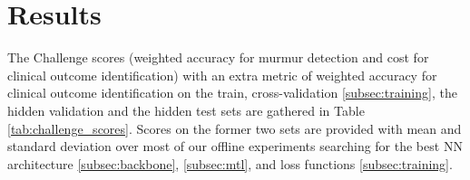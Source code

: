 \section{Results}
\label{sec:results}

The Challenge scores (weighted accuracy for murmur detection and cost for clinical outcome identification) with an extra metric of weighted accuracy for clinical outcome identification on the train, cross-validation \ref{subsec:training}, the hidden validation and the hidden test sets are gathered in Table \ref{tab:challenge_scores}. Scores on the former two sets are provided with mean and standard deviation over most of our offline experiments searching for the best NN architecture \ref{subsec:backbone}, \ref{subsec:mtl}, and loss functions \ref{subsec:training}.


% 
